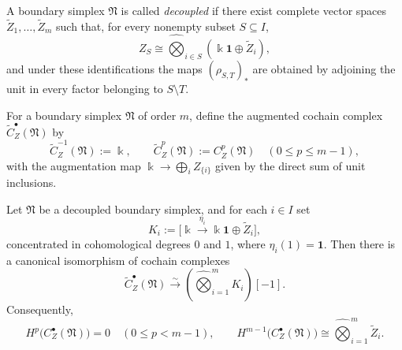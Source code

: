 \begin{definition}
\label{def:w-decoupled-simplex}
A boundary simplex $\mathfrak N$ is called \emph{decoupled} if there exist complete vector spaces
$\widetilde Z_1,\dots,\widetilde Z_m$ such that, for every nonempty subset $S\subseteq I$,
\[
Z_S\cong \widehat\bigotimes_{i\in S}(\Bbbk\mathbf{1}\oplus \widetilde Z_i),
\]
and under these identifications the maps $(\rho_{S,T})_*$ are obtained by adjoining the unit in every
factor belonging to $S\setminus T$.
\end{definition}

\begin{definition}
\label{def:w-augmented-center-complex}
For a boundary simplex $\mathfrak N$ of order $m$, define the augmented cochain complex
$\widetilde C_Z^\bullet(\mathfrak N)$ by
\[
\widetilde C_Z^{-1}(\mathfrak N):=\Bbbk,
\qquad
\widetilde C_Z^p(\mathfrak N):=C_Z^p(\mathfrak N)\quad (0\le p\le m-1),
\]
with the augmentation map $\Bbbk\to \bigoplus_i Z_{\{i\}}$ given by the direct sum of unit inclusions.
\end{definition}

\begin{theorem}
\label{thm:w-augmented-center-tensor-model}
Let $\mathfrak N$ be a decoupled boundary simplex, and for each $i\in I$ set
\[
K_i:=\bigl[\Bbbk\xrightarrow{\eta_i} \Bbbk\mathbf{1}\oplus \widetilde Z_i\bigr],
\]
concentrated in cohomological degrees $0$ and $1$, where $\eta_i(1)=\mathbf{1}$.
Then there is a canonical isomorphism of cochain complexes
\[
\widetilde C_Z^\bullet(\mathfrak N)
\xrightarrow{\sim}
\left(\widehat\bigotimes_{i=1}^m K_i\right)[-1].
\]
Consequently,
\[
H^p\bigl(C_Z^\bullet(\mathfrak N)\bigr)=0
\quad (0\le p<m-1),
\qquad
H^{m-1}\bigl(C_Z^\bullet(\mathfrak N)\bigr)
\cong
\widehat\bigotimes_{i=1}^m \widetilde Z_i.
\]
\end{theorem}

